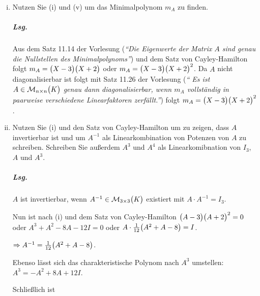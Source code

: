 \documentclass{scrreprt}
\begin{document}
\begin{enumerate}[(i)]
\item Nutzen Sie (i) und (v) um das Minimalpolynom $m_A$ zu finden.
  \subparagraph{Lsg.} Aus dem Satz 11.14 der Vorlesung (\emph{``Die Eigenwerte
    der Matrix $A$ sind genau die Nullstellen des Minimalpolynoms''}) und dem
  Satz von Cayley-Hamilton folgt $m_A = \qty\big(X - 3)\qty\big(X + 2)$ oder
  $m_A = \qty\big(X - 3)\qty\big(X + 2)^2$.
  Da $A$ nicht diagonalisierbar ist folgt mit Satz 11.26 der Vorlesung (\emph{``
    Es ist $A \in \mathcal{M}_{n \times n}\qty\big(K)$ genau dann
    diagonalisierbar, wenn $m_A$ vollständig in paarweise verschiedene
    Linearfaktoren zerfällt.''}) folgt $m_A = \qty\big(X - 3)\qty\big(X + 2)^2$.

\item Nutzen Sie (i) und den Satz von Cayley-Hamilton um zu zeigen, dass $A$
  invertierbar ist und um $A^{-1}$ als Linearkombination von Potenzen von $A$ zu
  schreiben.
  Schreiben Sie außerdem $A^3$ und $A^4$ als Linearkomibnation von $I_3$, $A$ und
  $A^3$.
  \subparagraph{Lsg.} $A$ ist invertierbar, wenn
  $A^{-1} \in \mathcal{M}_{3 \times 3}\qty\big(K)$ existiert mit
  $A \cdot A^{-1} = I_3$.

  Nun ist nach (i) und dem Satz von Cayley-Hamilton
  $\qty\big(A - 3)\qty\big(A + 2)^2 = 0$ oder $A^3 + A^2 - 8A - 12I = 0$
  oder $A \cdot \frac{1}{12}\qty\big(A^2 + A - 8) = I$.

  $\Rightarrow A^{-1} = \frac{1}{12}\qty\big(A^2 + A - 8)$.

  Ebenso lässt sich das charakteristische Polynom nach $A^3$ umstellen:
  $A^3 = -A^2 + 8A + 12I$.

  Schließlich ist
\end{enumerate}
\end{document}
